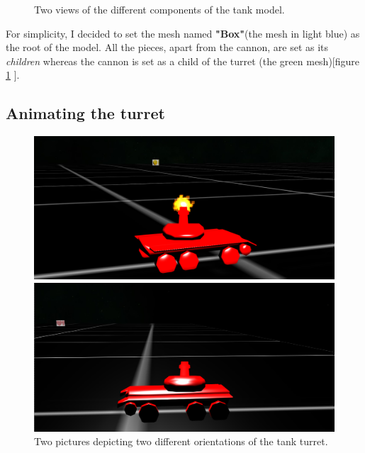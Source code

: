 \documentclass[14pt]{article}
\begin{document}
\begin{figure}[H]
\begin{minipage}[t]{0.45\textwidth}
\end{minipage}
\caption{Two views of the different components of the tank model.}
\label{img:modelInspection2}
\end{figure}


For simplicity, I decided to set the mesh named \textbf{"Box"}(the mesh in light blue) as the root of the model. All the pieces, apart from the cannon, are set as its \textit{children} whereas the cannon is set as a child of the turret (the green mesh)[figure \ref{img:modelInspection2} ].
\subsection{Animating the turret}

\begin{figure}[H]
\begin{minipage}[t]{0.45\textwidth}
\center
\includegraphics[width=\textwidth]{images/turret1.png}
\end{minipage}
\hfill
\begin{minipage}[t]{0.45\textwidth}
\center
\includegraphics[width=\textwidth]{images/turret2.png}
\end{minipage}
\caption{Two pictures depicting two different orientations of the tank turret.}
\label{img:turretOrientation}
\end{figure}
\end{document}
